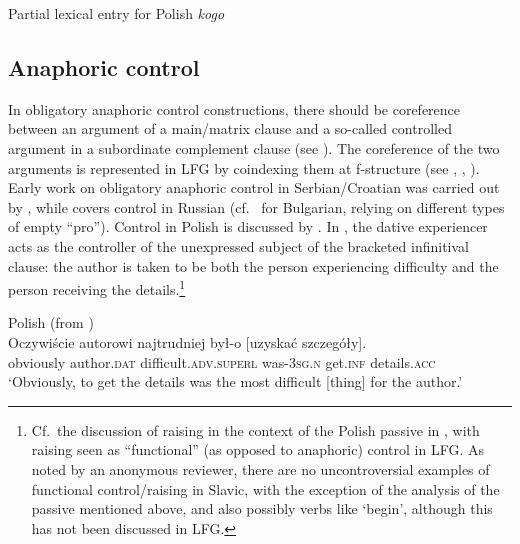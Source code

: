 \documentclass[output=paper,hidelinks]{langscibook}
\begin{document}
\ea%
    \label{ex:Slavic:33} Partial lexical entry for Polish \textit{kogo}\\[1ex]
    \z

           



\subsection{Anaphoric control}
\label{sec:Slavic:2.12}

In obligatory anaphoric control constructions, there should be coreference between an argument of a main/matrix clause and a so-called controlled argument in a subordinate complement clause (see \citealt[561ff.]{DLM:LFG}). The coreference of the two arguments is represented in LFG by coindexing them at f-structure (see , , ). Early work on obligatory anaphoric control in Serbian/Croatian was carried out by \citet{Zec1987}, while \citet{Neidle1982} covers control in Russian (cf.\ \citealt[607--610]{BojadievKucarovPencev1999} for Bulgarian, relying on different types of empty ``pro''). Control in Polish is discussed by \citet{PatejukPrzepiorkowski2018}. In , the dative experiencer acts as the controller of the unexpressed subject of the bracketed infinitival clause: the author is taken to be both the person experiencing difficulty and the person receiving the details.\footnote{Cf.\ the discussion of raising in the context of the Polish passive in , with raising seen as ``functional'' (as opposed to anaphoric) control in LFG. As noted by an anonymous reviewer, there are no uncontroversial examples of functional control/raising in Slavic, with the exception of the analysis of the passive mentioned above, and also possibly verbs like `begin', although this has not been discussed in LFG.}

\ea%
    \label{ex:Slavic:34}Polish (from \citealt[316]{PatejukPrzepiorkowski2018})\\
    \gll Oczywiście   autorowi     najtrudniej                 był-o           [uzyska\'{c}   szczegóły].\\
     obviously     author.\textsc{dat}  difficult.\textsc{adv.superl} was-\textsc{3sg.n}  get.\textsc{inf}      details.\textsc{acc}   \\
    \glt `Obviously, to get the details was the most difficult [thing] for the author.' 
    \z
\end{document}
